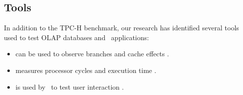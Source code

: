 \subsection{Tools}
\label{sub:Tools}
In addition to the TPC-H benchmark, our research has identified several tools used to test OLAP databases and \bd~applications:
\begin{itemize}
  \item {} can be used to observe branches and cache effects \cite{Neumann2011-uq}.
  \item {} measures processor cycles and execution time \cite{Willhalm2013-ri}.
  \item {} is used by \qlikview~to test user interaction \cite{Qlik2012-ku}.
\end{itemize}
